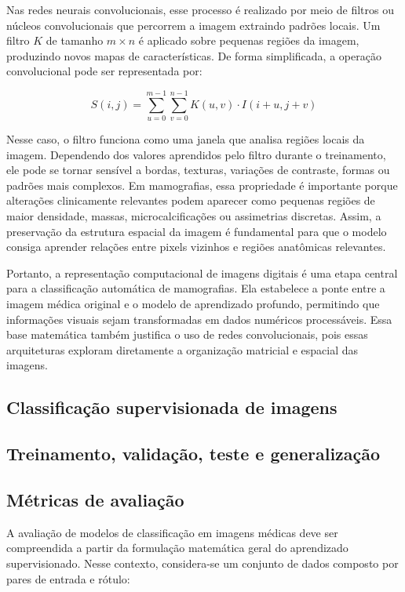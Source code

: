 \documentclass[
    12pt,
    openright,
    oneside,
    a4paper,
    english,
    brazil
]{abntex2}
\begin{document}
Nas redes neurais convolucionais, esse processo é realizado por meio de filtros ou núcleos convolucionais que percorrem a imagem extraindo padrões locais. Um filtro \(K\) de tamanho \(m \times n\) é aplicado sobre pequenas regiões da imagem, produzindo novos mapas de características. De forma simplificada, a operação convolucional pode ser representada por:

\[
S(i,j) = \sum_{u=0}^{m-1}\sum_{v=0}^{n-1} K(u,v) \cdot I(i+u,j+v)
\]

Nesse caso, o filtro funciona como uma janela que analisa regiões locais da imagem. Dependendo dos valores aprendidos pelo filtro durante o treinamento, ele pode se tornar sensível a bordas, texturas, variações de contraste, formas ou padrões mais complexos. Em mamografias, essa propriedade é importante porque alterações clinicamente relevantes podem aparecer como pequenas regiões de maior densidade, massas, microcalcificações ou assimetrias discretas. Assim, a preservação da estrutura espacial da imagem é fundamental para que o modelo consiga aprender relações entre pixels vizinhos e regiões anatômicas relevantes.

Portanto, a representação computacional de imagens digitais é uma etapa central para a classificação automática de mamografias. Ela estabelece a ponte entre a imagem médica original e o modelo de aprendizado profundo, permitindo que informações visuais sejam transformadas em dados numéricos processáveis. Essa base matemática também justifica o uso de redes convolucionais, pois essas arquiteturas exploram diretamente a organização matricial e espacial das imagens.

\subsection{Classificação supervisionada de imagens}

\subsection{Treinamento, validação, teste e generalização}

\subsection{Métricas de avaliação}
\label{subsec:metricas_avaliacao}

A avaliação de modelos de classificação em imagens médicas deve ser compreendida a partir da formulação matemática geral do aprendizado supervisionado. Nesse contexto, considera-se um conjunto de dados composto por pares de entrada e rótulo:
\end{document}
